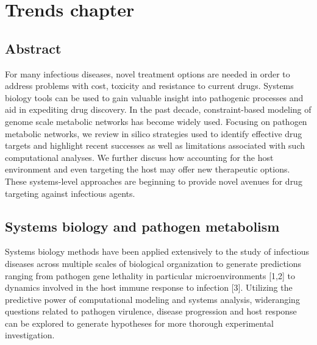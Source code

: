 \doublespacing

\chapter{ Trends chapter }

\section{Abstract}
For many infectious diseases, novel treatment options are needed 
in order to address problems with cost, toxicity and resistance to 
current drugs. Systems biology tools can be used to gain valuable 
insight into pathogenic processes and aid in expediting drug discovery. 
In the past decade, constraint-based modeling of genome scale 
metabolic networks has become widely used. Focusing on pathogen 
metabolic networks, we review in silico strategies used to identify 
effective drug targets and highlight recent successes as well as 
limitations associated with such computational analyses. We further 
discuss how accounting for the host environment and even targeting the 
host may offer new therapeutic options. These systems-level approaches 
are beginning to provide novel avenues for drug targeting against 
infectious agents.

\section{Systems biology and pathogen metabolism}
Systems biology methods have been applied extensively to the 
study of infectious diseases across multiple scales of 
biological organization to generate predictions ranging from pathogen 
gene lethality in particular microenvironments [1,2] to dynamics 
involved in the host immune response to infection [3]. Utilizing 
the predictive power of computational modeling and systems analysis, 
wideranging questions related to pathogen virulence, disease 
progression and host response can be explored to generate hypotheses 
for more thorough experimental investigation.

